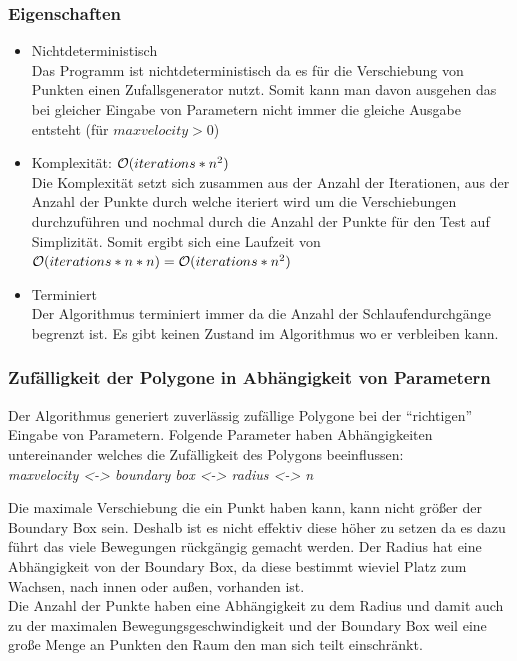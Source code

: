 \subsubsection{Eigenschaften}
\begin{itemize}
	\item Nichtdeterministisch\\
	Das Programm ist nichtdeterministisch da es für die Verschiebung von Punkten einen Zufallsgenerator nutzt. Somit kann man davon ausgehen das bei gleicher Eingabe von Parametern nicht immer die gleiche Ausgabe entsteht (für $maxvelocity > 0$)
	\item Komplexität: $\mathcal{O}(iterations*n^2)$\\
	Die Komplexität setzt sich zusammen aus der Anzahl der Iterationen, aus der Anzahl der Punkte durch welche iteriert wird um die Verschiebungen durchzuführen und nochmal durch die Anzahl der Punkte für den Test auf Simplizität. Somit ergibt sich eine Laufzeit von $\mathcal{O}(iterations*n*n) = \mathcal{O}(iterations*n^2)$
	\item Terminiert\\
	Der Algorithmus terminiert immer da die Anzahl der Schlaufendurchgänge begrenzt ist. Es gibt keinen Zustand im Algorithmus wo er verbleiben kann.
\end{itemize}

\subsubsection{Zufälligkeit der Polygone in Abhängigkeit von Parametern}
Der Algorithmus generiert zuverlässig zufällige Polygone bei der \enquote{richtigen} Eingabe von Parametern. Folgende Parameter haben Abhängigkeiten untereinander welches die Zufälligkeit des Polygons beeinflussen:\\
\textit{maxvelocity <-> boundary box <-> radius <-> n}

Die maximale Verschiebung die ein Punkt haben kann, kann nicht größer der Boundary Box sein. Deshalb ist es nicht effektiv diese höher zu setzen da es dazu führt das viele Bewegungen rückgängig gemacht werden.
Der Radius hat eine Abhängigkeit von der Boundary Box, da diese bestimmt wieviel Platz zum Wachsen, nach innen oder außen, vorhanden ist.\\
Die Anzahl der Punkte haben eine Abhängigkeit zu dem Radius und damit auch zu der maximalen Bewegungsgeschwindigkeit und der Boundary Box weil eine große Menge an Punkten den Raum den man sich teilt einschränkt.
